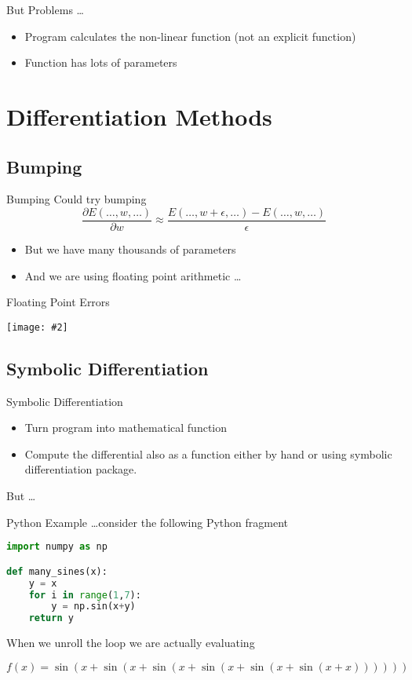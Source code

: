 \documentclass{beamer}
\newcommand {\framedgraphic}[2] {
    \begin{frame}{#1}
        \begin{center}
            \texttt{[image: \#2]}
        \end{center}
    \end{frame}
}
\begin{document}
\begin{frame}{But Problems \ldots}
\begin{itemize}
\item
Program calculates the non-linear function (not an explicit function)
\item
Function has lots of parameters
\end{itemize}
\end{frame}

\section{Differentiation Methods}

\subsection{Bumping}

\begin{frame}{Bumping}
Could try bumping
$$
\frac{\partial E(\ldots, w, \ldots)}{\partial w} \approx \frac{E(\ldots, w + \epsilon, \ldots) - E(\ldots, w, \ldots)}{\epsilon}
$$
\begin{itemize}
\item
But we have many thousands of parameters
\item
And we are using floating point arithmetic \ldots
\end{itemize}
\end{frame}

\framedgraphic{Floating Point Errors}{diagrams/13a2bd186a0e123f040da9491fa98684.png}

\subsection{Symbolic Differentiation}
\begin{frame}[fragile]{Symbolic Differentiation}
\begin{itemize}
\item
Turn program into mathematical function
\item
Compute the differential also as a function either by hand or using
symbolic differentiation package.
\end{itemize}

But \ldots
\end{frame}

\begin{frame}[fragile]{Python Example}
\ldots consider the following Python fragment
\begin{lstlisting}[language=Python]
import numpy as np

def many_sines(x):
    y = x
    for i in range(1,7):
        y = np.sin(x+y)
    return y
\end{lstlisting}

When we unroll the loop we are actually evaluating

$$
f(x) = \sin(x + \sin(x + \sin(x + \sin(x + \sin(x + \sin(x + x))))))
$$

\end{frame}
\end{document}
